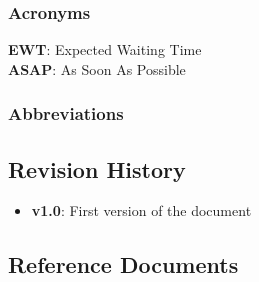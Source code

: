 \subsubsection{Acronyms}
\textbf{EWT}: Expected Waiting Time\\
\textbf{ASAP}: As Soon As Possible\\
\subsubsection{Abbreviations}


\subsection{Revision History}
\begin{itemize}
	\item
	\textbf{v1.0}: First version of the document
\end{itemize}


\subsection{Reference Documents}

